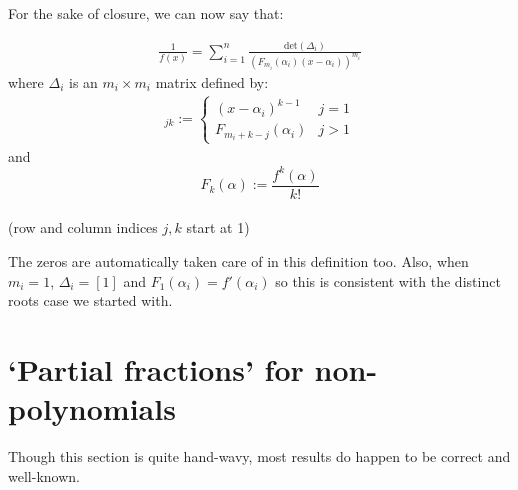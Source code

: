 \documentclass{article}
\begin{document}
For the sake of closure, we can now say that:
\begin{tcolorbox}
\begin{align}
    \frac{1}{f(x)} = \sum_{i=1}^{n} \frac{\textrm{det}(\Delta_i)}{\left(F_{m_i}(\alpha_i)(x-\alpha_i)\right)^{m_i}} \label{repeated}
\end{align}
where $\Delta_i$ is an $m_i \times m_i$ matrix defined by:
\begin{align}
    [\Delta_i]_{jk} := \begin{cases}(x-\alpha_i)^{k-1} & j = 1 \\ F_{m_i+k-j}(\alpha_i) & j>1\end{cases} \nonumber
\end{align}
and $$F_k(\alpha) := \frac{f^k(\alpha)}{k!}$$
\\(row and column indices $j,k$ start at 1)
\end{tcolorbox}

The zeros are automatically taken care of in this definition too. Also, when $m_i = 1$, $\Delta_i = [1]$ and $F_1(\alpha_i) = f'(\alpha_i)$ so this is consistent with the distinct roots case we started with.

\section*{`Partial fractions' for non-polynomials}

\begin{tcolorbox}
Though this section is quite hand-wavy, most results do happen to be correct and well-known.
\end{tcolorbox}
\end{document}
